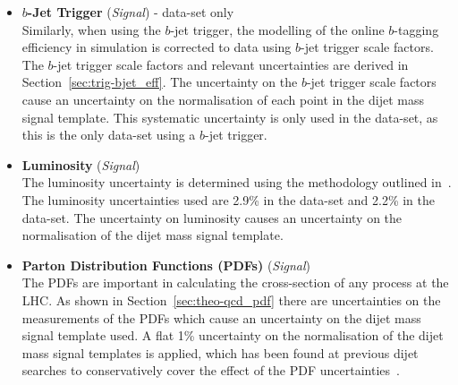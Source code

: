 \begin{itemize}[leftmargin=*]
\newpage
\item\textbf{$b$-Jet Trigger} \hspace{1mm} (\textit{Signal}) - \lm{} data-set only\\
  Similarly, when using the $b$-jet trigger,
  the modelling of the online $b$-tagging efficiency in simulation is corrected to data using $b$-jet trigger scale factors.
  The $b$-jet trigger scale factors and relevant uncertainties are derived in Section~\ref{sec:trig-bjet_eff}.
  The uncertainty on the $b$-jet trigger scale factors cause an uncertainty on the normalisation of each point in the dijet mass signal template.
  This systematic uncertainty is only used in the \lm{} data-set, as this is the only data-set using a $b$-jet trigger.
  \vspace{0.3em}
\item\textbf{Luminosity} \hspace{1mm} (\textit{Signal})\\
  The luminosity uncertainty is determined using the methodology outlined in~\cite{lim-syst_lumi}.
  The luminosity uncertainties used are 2.9\% in the \summer{} data-set and 2.2\% in the \lm{} data-set.
  The uncertainty on luminosity causes an uncertainty on the normalisation of the dijet mass signal template.
  \vspace{0.3em}
\item\textbf{Parton Distribution Functions (PDFs) } \hspace{1mm}  (\textit{Signal})\\
  The PDFs are important in calculating the cross-section of any process at the LHC.
  As shown in Section~\ref{sec:theo-qcd_pdf} there are uncertainties on the measurements of the PDFs
  which cause an uncertainty on the dijet mass signal template used.
  A flat 1\% uncertainty on the normalisation of the dijet mass signal templates is applied,
  which has been found at previous dijet searches to conservatively cover
  the effect of the PDF uncertainties~\cite{dijet-mori16_paper,dijet-isr}.
\end{itemize}

